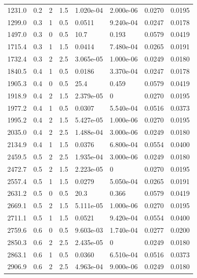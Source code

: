 \documentclass[preview]{standalone}
\begin{document}
{{\begin{tabular}{L{1.2cm}C{1.2cm} C{0.3cm}C{0.5cm} C{1.4cm}C{1.4cm} C{1.4cm}C{1.4cm}}
  1231.0  &   0.2  & 2     & 1.5 &  1.020e-04  & 2.000e-06  & 0.0270 &  0.0195   \\ 
  1299.0  &   0.3  & 1     & 0.5 &  0.0511  & 9.240e-04  & 0.0247 &  0.0178   \\ 
  1497.0  &   0.3  & 0     & 0.5 &  10.7  & 0.193  & 0.0579 &  0.0419   \\ 
  1715.4  &   0.3  & 1     & 1.5 &  0.0414  & 7.480e-04  & 0.0265 &  0.0191   \\ 
  1732.4  &   0.3  & 2     & 2.5 &  3.065e-05  & 1.000e-06  & 0.0249 &  0.0180   \\ 
  1840.5  &   0.4  & 1     & 0.5 &  0.0186  & 3.370e-04  & 0.0247 &  0.0178   \\ 
  1905.3  &   0.4  & 0     & 0.5 &  25.4  & 0.459  & 0.0579 &  0.0419   \\ 
  1918.9  &   0.4  & 2     & 1.5 &  2.379e-05  & 0  & 0.0270 &  0.0195   \\ 
  1977.2  &   0.4  & 1     & 0.5 &  0.0307  & 5.540e-04  & 0.0516 &  0.0373   \\ 
  1995.2  &   0.4  & 2     & 1.5 &  5.427e-05  & 1.000e-06  & 0.0270 &  0.0195   \\ 
  2035.0  &   0.4  & 2     & 2.5 &  1.488e-04  & 3.000e-06  & 0.0249 &  0.0180   \\ 
  2134.9  &   0.4  & 1     & 1.5 &  0.0376  & 6.800e-04  & 0.0554 &  0.0400   \\ 
  2459.5  &   0.5  & 2     & 2.5 &  1.935e-04  & 3.000e-06  & 0.0249 &  0.0180   \\ 
  2472.7  &   0.5  & 2     & 1.5 &  2.223e-05  & 0  & 0.0270 &  0.0195   \\ 
  2557.4  &   0.5  & 1     & 1.5 &  0.0279  & 5.050e-04  & 0.0265 &  0.0191   \\ 
  2631.2  &   0.5  & 0     & 0.5 &  20.3  & 0.366  & 0.0579 &  0.0419   \\ 
  2669.1  &   0.5  & 2     & 1.5 &  5.111e-05  & 1.000e-06  & 0.0270 &  0.0195   \\ 
  2711.1  &   0.5  & 1     & 1.5 &  0.0521  & 9.420e-04  & 0.0554 &  0.0400   \\ 
  2759.6  &   0.6  & 0     & 0.5 &  9.603e-03  & 1.740e-04  & 0.0277 &  0.0200   \\ 
  2850.3  &   0.6  & 2     & 2.5 &  2.435e-05  & 0  & 0.0249 &  0.0180   \\ 
  2863.1  &   0.6  & 1     & 0.5 &  0.0360  & 6.510e-04  & 0.0516 &  0.0373   \\ 
  2906.9  &   0.6  & 2     & 2.5 &  4.963e-04  & 9.000e-06  & 0.0249 &  0.0180   \\ 

\end{tabular}}}
\end{document}
